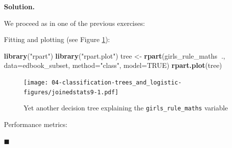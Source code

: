 \documentclass[10pt,b5paper,krantz1]{krantz}
\newenvironment{Shaded}{\begin{snugshade}}{\end{snugshade}}
\newcommand{\DataTypeTok}[1]{\textcolor[rgb]{0.27,0.27,0.27}{#1}}
\newcommand{\KeywordTok}[1]{\textcolor[rgb]{0.27,0.27,0.27}{\textbf{#1}}}
\newcommand{\NormalTok}[1]{#1}
\newcommand{\OperatorTok}[1]{\textcolor[rgb]{0.43,0.43,0.43}{\textbf{#1}}}
\newcommand{\OtherTok}[1]{\textcolor[rgb]{0.37,0.37,0.37}{#1}}
\newcommand{\StringTok}[1]{\textcolor[rgb]{0.5,0.5,0.5}{#1}}
\newenvironment{solution}{%
\bigskip\noindent\textbf{Solution. }%
\it\ignorespaces%
\ignorespaces%
}{\ignorespaces%
\hfill$\blacksquare$%
}
\begin{document}
\begin{solution}

We proceed as in one of the previous exercises:

\begin{Shaded}
\end{Shaded}

Fitting and plotting (see Figure \ref{fig:joinedstats9}):

\begin{Shaded}
\begin{Highlighting}[]
\KeywordTok{library}\NormalTok{(}\StringTok{"rpart"}\NormalTok{)}
\KeywordTok{library}\NormalTok{(}\StringTok{"rpart.plot"}\NormalTok{)}
\NormalTok{tree <-}\StringTok{ }\KeywordTok{rpart}\NormalTok{(girls_rule_maths}\OperatorTok{~}\NormalTok{., }\DataTypeTok{data=}\NormalTok{edbook_subset,}
    \DataTypeTok{method=}\StringTok{"class"}\NormalTok{, }\DataTypeTok{model=}\OtherTok{TRUE}\NormalTok{)}
\KeywordTok{rpart.plot}\NormalTok{(tree)}
\end{Highlighting}
\end{Shaded}

\begin{figure}
\hypertarget{fig:joinedstats9}{%
\centering
\texttt{[image: 04-classification-trees\_and\_logistic-figures/joinedstats9-1.pdf]}
\caption{Yet another decision tree explaining the \texttt{girls\_rule\_maths} variable}\label{fig:joinedstats9}
}
\end{figure}

Performance metrics:

\begin{Shaded}
\end{Shaded}


\end{solution}
\end{document}
